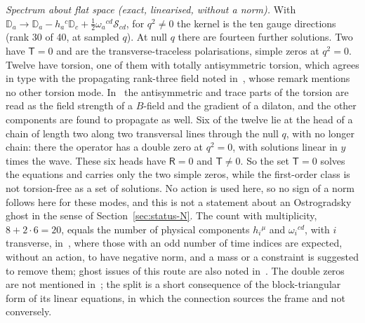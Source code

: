 \emph{Spectrum about flat space (exact, linearised, without a norm).} With \(\mathbb D_a\to\mathbb D_a-h_a{}^c\mathbb D_c+\tfrac12\omega_a{}^{cd}\mathcal S_{cd}\), for \(q^2\neq0\) the kernel is the ten gauge directions (rank 30 of 40, at sampled \(q\)). At null \(q\) there are fourteen further solutions. Two have \(\mathsf T=0\) and are the transverse-traceless polarisations, simple zeros at \(q^2=0\). Twelve have torsion, one of them with totally antisymmetric torsion, which agrees in type with the propagating rank-three field noted in~\cite{HanadaKawaiKimura2006}, whose remark mentions no other torsion mode. In~\cite{FurutaHanadaKawaiKimura2007} the antisymmetric and trace parts of the torsion are read as the field strength of a \(B\)-field and the gradient of a dilaton, and the other components are found to propagate as well. Six of the twelve lie at the head of a chain of length two along two transversal lines through the null \(q\), with no longer chain: there the operator has a double zero at \(q^2=0\), with solutions linear in \(y\) times the wave. These six heads have \(\mathsf R=0\) and \(\mathsf T\neq0\). So the set \(\mathsf T=0\) solves the equations and carries only the two simple zeros, while the first-order class is not torsion-free as a set of solutions. No action is used here, so no sign of a norm follows here for these modes, and this is not a statement about an Ostrogradsky ghost in the sense of Section~\ref{sec:status-N}. The count with multiplicity, \(8+2\cdot6=20\), equals the number of physical components \(h_i{}^\mu\) and \(\omega_i{}^{cd}\), with \(i\) transverse, in~\cite{FurutaHanadaKawaiKimura2007}, where those with an odd number of time indices are expected, without an action, to have negative norm, and a mass or a constraint is suggested to remove them; ghost issues of this route are also noted in~\cite{Steinacker2019NoGhost}. The double zeros are not mentioned in~\cite{FurutaHanadaKawaiKimura2007}; the split is a short consequence of the block-triangular form of its linear equations, in which the connection sources the frame and not conversely.

